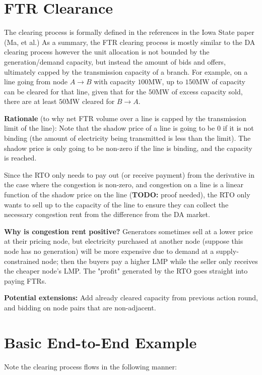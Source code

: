 \documentclass[11pt]{article}
\begin{document}
\newpage

\section{FTR Clearance}
The clearing process is formally defined in the references in the Iowa State paper (Ma, et al.) As a summary, the FTR clearing process is mostly similar to the DA clearing process however the unit allocation is not bounded by the generation/demand capacity, but instead the amount of bids and offers, ultimately capped by the transmission capacity of a branch. For example, on a line going from node $A \rightarrow B$ with capacity $100\text{MW}$, up to $150\text{MW}$ of capacity can be cleared for that line, given that for the $50\text{MW}$ of excess capacity sold, there are at least $50\text{MW}$ cleared for $B \rightarrow A$.

\textbf{Rationale} (to why net FTR volume over a line is capped by the transmission limit of the line): Note that the shadow price of a line is going to be 0 if it is not binding (the amount of electricity being transmitted is less than the limit). The shadow price is only going to be non-zero if the line is binding, and the capacity is reached.

Since the RTO only needs to pay out (or receive payment) from the derivative in the case where the congestion is non-zero, and congestion on a line is a linear function of the shadow price on the line (\textbf{TODO:} proof needed), the RTO only wants to sell up to the capacity of the line to ensure they can collect the necessary congestion rent from the difference from the DA market.

\textbf{Why is congestion rent positive? } Generators sometimes sell at a lower price at their pricing node, but electricity purchased at another node (suppose this node has no generation) will be more expensive due to demand at a supply-constrained node; then the buyers pay a higher LMP while the seller only receives the cheaper node's LMP. The "profit" generated by the RTO goes straight into paying FTRs.

\textbf{Potential extensions:} Add already cleared capacity from previous action round, and bidding on node pairs that are non-adjacent.

\section{Basic End-to-End Example}

Note the clearing process flows in the following manner:
\end{document}
